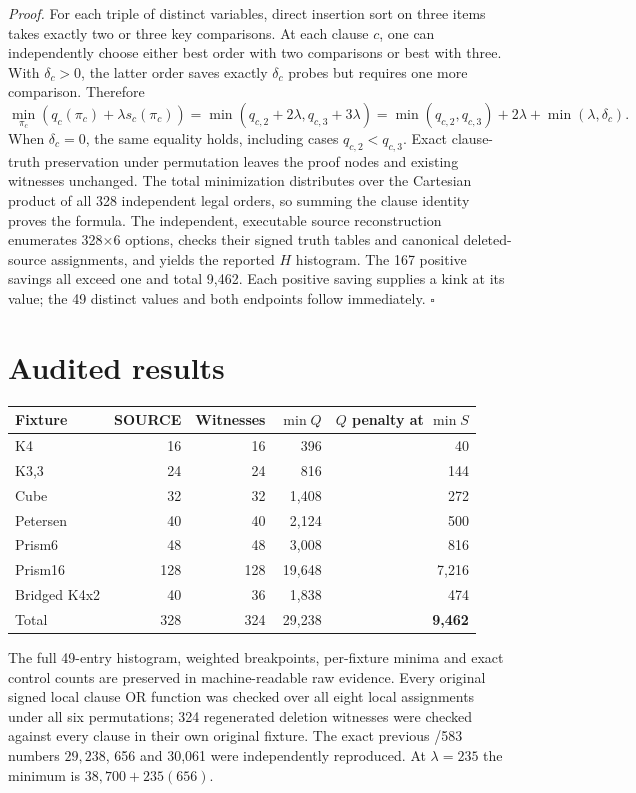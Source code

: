 \documentclass[11pt]{article}
\begin{document}
\noindent\emph{Proof.}
For each triple of distinct variables, direct insertion sort on three items takes exactly two or three key comparisons. At each clause $c$, one can independently choose either best order with two comparisons or best with three. With $\delta_c>0$, the latter order saves exactly $\delta_c$ probes but requires one more comparison. Therefore
\[
\min_{\pi_c}(q_c(\pi_c)+\lambda s_c(\pi_c))
=\min(q_{c,2}+2\lambda,q_{c,3}+3\lambda)
=\min(q_{c,2},q_{c,3})+2\lambda+\min(\lambda,\delta_c).
\]
When $\delta_c=0$, the same equality holds, including cases $q_{c,2}<q_{c,3}$. Exact clause-truth preservation under permutation leaves the proof nodes and existing witnesses unchanged. The total minimization distributes over the Cartesian product of all 328 independent legal orders, so summing the clause identity proves the formula. The independent, executable source reconstruction enumerates 328$\times$6 options, checks their signed truth tables and canonical deleted-source assignments, and yields the reported $H$ histogram. The 167 positive savings all exceed one and total 9,462. Each positive saving supplies a kink at its value; the 49 distinct values and both endpoints follow immediately. \(\square\)

\section*{Audited results}
\begin{center}
\begin{tabular}{@{}lrrrr@{}}\toprule
Fixture & SOURCE & Witnesses & $\min Q$ & $Q$ penalty at $\min S$\\\midrule
K4 & 16 & 16 & 396 & 40\\
K3,3 & 24 & 24 & 816 & 144\\
Cube & 32 & 32 & 1,408 & 272\\
Petersen & 40 & 40 & 2,124 & 500\\
Prism6 & 48 & 48 & 3,008 & 816\\
Prism16 & 128 & 128 & 19,648 & 7,216\\
Bridged K4x2 & 40 & 36 & 1,838 & 474\\\midrule
Total & 328 & 324 & 29,238 & \textbf{9,462}\\\bottomrule
\end{tabular}
\end{center}
The full 49-entry histogram, weighted breakpoints, per-fixture minima and exact control counts are preserved in machine-readable raw evidence. Every original signed local clause OR function was checked over all eight local assignments under all six permutations; 324 regenerated deletion witnesses were checked against every clause in their own original fixture. The exact previous /583 numbers $29{,}238$, 656 and 30,061 were independently reproduced. At $\lambda=235$ the minimum is $38{,}700+235(656)$.
\end{document}
